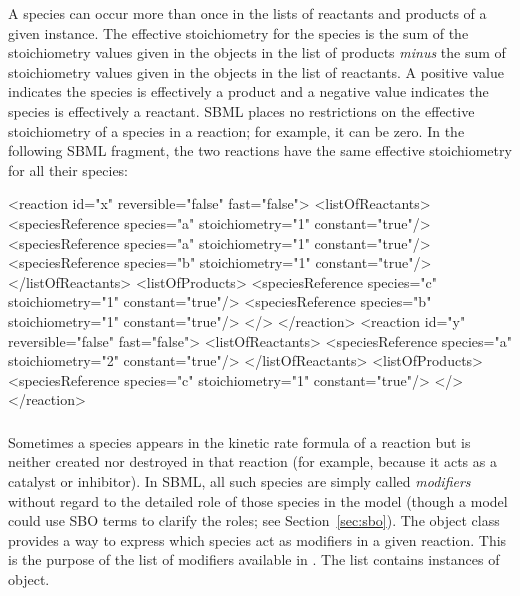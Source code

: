 A species can occur more than once in the lists of reactants and
products of a given \Reaction instance.  The effective
stoichiometry for the species is the sum of the stoichiometry
values given in the \SpeciesReference objects in the list of
products \emph{minus} the sum of stoichiometry values given in the
\SpeciesReference objects in the list of reactants.  A positive
value indicates the species is effectively a product and a
negative value indicates the species is effectively a reactant.
SBML places no restrictions on the effective stoichiometry of a
species in a reaction; for example, it can be zero.  In the
following SBML fragment, the two reactions have the same effective
stoichiometry for all their species:

\begin{example}
<reaction id="x" reversible="false" fast="false">
    <listOfReactants>
        <speciesReference species="a" stoichiometry="1" constant="true"/>
        <speciesReference species="a" stoichiometry="1" constant="true"/>
        <speciesReference species="b" stoichiometry="1" constant="true"/>
    </listOfReactants>
    <listOfProducts>
        <speciesReference species="c" stoichiometry="1" constant="true"/>
        <speciesReference species="b" stoichiometry="1" constant="true"/>
    </>
</reaction>
<reaction id="y" reversible="false" fast="false">
    <listOfReactants>
        <speciesReference species="a" stoichiometry="2" constant="true"/>
    </listOfReactants>
    <listOfProducts>
        <speciesReference species="c" stoichiometry="1" constant="true"/>
    </>
</reaction>
\end{example}



\subsubsection{}
\label{subsec:modifierreference}

Sometimes a species appears in the kinetic rate formula of a
reaction but is neither created nor destroyed in that reaction
(for example, because it acts as a catalyst or inhibitor).  In
SBML, all such species are simply called \emph{modifiers} without
regard to the detailed role of those species in the model (though
a model could use SBO terms to clarify the roles; see
Section~\ref{sec:sbo}).  The \Reaction object class provides a way
to express which species act as modifiers in a given reaction.
This is the purpose of the list of modifiers available in
\Reaction.  The list contains instances of
\ModifierSpeciesReference object.

